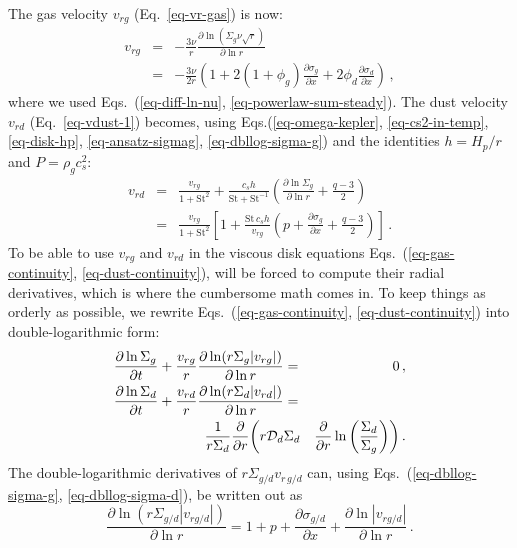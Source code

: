 \documentclass{aa}
\def\comma{\,,}
\def\fullstop{\,.}
\begin{document}
The gas velocity $v_{rg}$ (Eq.~\ref{eq-vr-gas}) is now:
\begin{eqnarray}
  v_{rg} &=& -\frac{3\nu}{r} \frac{\partial\ln(\Sigma_g\nu\sqrt{r})}{\partial \ln r}\\
  &=& -\frac{3\nu}{2r}\left(1+2(1+\phi_g)\frac{\partial\sigma_g}{\partial x}+2\phi_d\frac{\partial\sigma_d}{\partial x}\right)
\comma\label{eq-vrgin-nu-with-perturb}
\end{eqnarray}
where we used Eqs.~(\ref{eq-diff-ln-nu}, \ref{eq-powerlaw-sum-steady}). The
dust velocity $v_{rd}$ (Eq.~\ref{eq-vdust-1}) becomes, using
Eqs.(\ref{eq-omega-kepler}, \ref{eq-cs2-in-temp}, \ref{eq-disk-hp},
\ref{eq-ansatz-sigmag}, \ref{eq-dbllog-sigma-g}) and the identities $h=H_p/r$
and $P=\rho_gc_s^2$:
\begin{eqnarray}
\label{eq-vdust-2}
  v_{rd} &=& \frac{v_{rg}}{1+\mathrm{St}^2} 
  + \frac{c_sh}{\mathrm{St}+\mathrm{St}^{-1}}
\left(\frac{\partial \ln \Sigma_g}{\partial \ln r} + \frac{q-3}{2}\right)\\
  &=& \frac{v_{rg}}{1+\mathrm{St}^2} \left[1+\frac{\mathrm{St}\,c_sh}{v_{rg}}
    \left(p+\frac{\partial \sigma_g}{\partial x} + \frac{q-3}{2}\right)\right]
\fullstop\label{eq-vrdin-nu-with-perturb}
\end{eqnarray}
To be able to use $v_{rg}$ and $v_{rd}$ in the viscous disk equations
Eqs.~(\ref{eq-gas-continuity}, \ref{eq-dust-continuity}), will be forced
to compute their radial derivatives, which is where the cumbersome math
comes in. To keep things as orderly as possible, we rewrite
Eqs.~(\ref{eq-gas-continuity}, \ref{eq-dust-continuity}) into double-logarithmic
form:
\begin{eqnarray}
\frac{\partial\ln \Sigma_{g}}{\partial t} +
  \frac{v_{rg}}{r}\frac{\partial\ln(r\Sigma_g |v_{rg}|)}{\partial\ln r}
  &=& 0\comma\label{eq-gas-continuity-doublog}\\
\frac{\partial\ln \Sigma_{d}}{\partial t} +
  \frac{v_{rd}}{r}\frac{\partial\ln(r\Sigma_d |v_{rd}|)}{\partial\ln r}
  &=& \nonumber\\
  \frac{1}{r\Sigma_d}\frac{\partial}{\partial r}
  \bigg(r{\cal D}_d & \Sigma_d & \frac{\partial}{\partial r}
  \ln\bigg(\frac{\Sigma_d}{\Sigma_g}\bigg)\bigg)\fullstop\label{eq-dust-continuity-doublog}
\end{eqnarray}
The double-logarithmic derivatives of $r\Sigma_{g/d}v_{r\,g/d}$ can, using
Eqs.~(\ref{eq-dbllog-sigma-g}, \ref{eq-dbllog-sigma-d}), be written out as
\begin{equation}\label{eq-dlog-cons-term}
  \frac{\partial\ln(r\Sigma_{g/d} |v_{rg/d}|)}{\partial\ln r}
  = 1 + p + \frac{\partial\sigma_{g/d}}{\partial x} +
  \frac{\partial\ln |v_{rg/d}|}{\partial\ln r}\fullstop
\end{equation}
\end{document}
